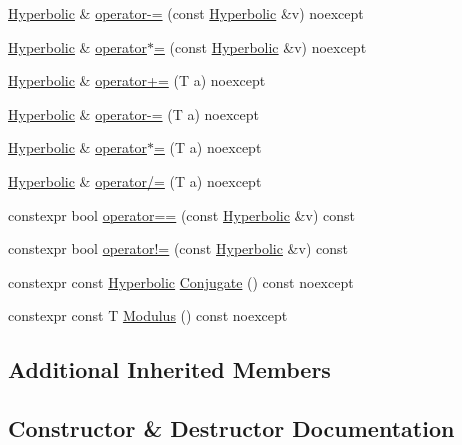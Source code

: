 \begin{DoxyCompactItemize}
\item 
\mbox{\hyperlink{structmage_1_1_hyperbolic}{Hyperbolic}} \& \mbox{\hyperlink{structmage_1_1_hyperbolic_a8f5bd1ce6f0d277874b85c432fc5486f}{operator-\/=}} (const \mbox{\hyperlink{structmage_1_1_hyperbolic}{Hyperbolic}} \&v) noexcept
\item 
\mbox{\hyperlink{structmage_1_1_hyperbolic}{Hyperbolic}} \& \mbox{\hyperlink{structmage_1_1_hyperbolic_a20668a0c836528a217de1c27ac306be5}{operator$\ast$=}} (const \mbox{\hyperlink{structmage_1_1_hyperbolic}{Hyperbolic}} \&v) noexcept
\item 
\mbox{\hyperlink{structmage_1_1_hyperbolic}{Hyperbolic}} \& \mbox{\hyperlink{structmage_1_1_hyperbolic_ae9bc9bf1db1ba4968912368514ed02f9}{operator+=}} (T a) noexcept
\item 
\mbox{\hyperlink{structmage_1_1_hyperbolic}{Hyperbolic}} \& \mbox{\hyperlink{structmage_1_1_hyperbolic_ac01422f8f5f1e54fa9049679f24e54cc}{operator-\/=}} (T a) noexcept
\item 
\mbox{\hyperlink{structmage_1_1_hyperbolic}{Hyperbolic}} \& \mbox{\hyperlink{structmage_1_1_hyperbolic_a5e8f03e6344d4a4ab2b606d9e0cfeee8}{operator$\ast$=}} (T a) noexcept
\item 
\mbox{\hyperlink{structmage_1_1_hyperbolic}{Hyperbolic}} \& \mbox{\hyperlink{structmage_1_1_hyperbolic_ab89a46778d4ab42d0e5cd2a68c9b5278}{operator/=}} (T a) noexcept
\item 
constexpr bool \mbox{\hyperlink{structmage_1_1_hyperbolic_a27b3be8e8a691994681805d86501b152}{operator==}} (const \mbox{\hyperlink{structmage_1_1_hyperbolic}{Hyperbolic}} \&v) const
\item 
constexpr bool \mbox{\hyperlink{structmage_1_1_hyperbolic_ad278371ef6d082686faa09615d44cd44}{operator!=}} (const \mbox{\hyperlink{structmage_1_1_hyperbolic}{Hyperbolic}} \&v) const
\item 
constexpr const \mbox{\hyperlink{structmage_1_1_hyperbolic}{Hyperbolic}} \mbox{\hyperlink{structmage_1_1_hyperbolic_ace982d2de87fd9033c85edcbb993d54e}{Conjugate}} () const noexcept
\item 
constexpr const T \mbox{\hyperlink{structmage_1_1_hyperbolic_a6ca0036618e4e28f89e462cc945eacaf}{Modulus}} () const noexcept
\end{DoxyCompactItemize}
\subsection*{Additional Inherited Members}


\subsection{Constructor \& Destructor Documentation}
\mbox{\label{structmage_1_1_hyperbolic_a8ea2afb84fb80f5bffb8ddb425e3987a}} 
